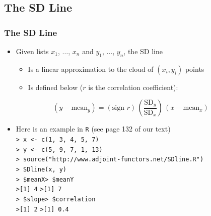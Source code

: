 \documentclass[t]{beamer}
\begin{document}
\subsection{The SD Line}
\begin{frame}[t]\frametitle{The SD Line}
{\small
\begin{itemize}
\item Given lists $x_1$, $\dots$, $x_n$ and $y_1$, $\dots$, $y_n$, the SD line 
   \begin{itemize}
   \item Is a linear approximation to the cloud of $(x_i, y_i)$ points
   \item Is defined below ($r$ is the  correlation coefficient):
\vspace{-4pt}
   \end{itemize}
\end{itemize}
\[\left(y - \mbox{mean}_y\right) = \left(\mbox{sign $r$}\right)\,
   \left(\frac{\mbox{SD}_y}{\mbox{SD}_x}\right)\,\left(x - \mbox{mean}_x\right)\]\vspace{-10pt}
\begin{itemize}
\item Here is an example in \texttt{R} (see page 132 of our text)\\
\texttt{> x <- c(1, 3, 4, 5, 7)}\\
\texttt{> y <- c(5, 9, 7, 1, 13)}\\
\texttt{> source("http://www.adjoint-functors.net/SDline.R")}\\
\texttt{> SDline(x, y)}\\
\texttt{> \$meanX}\hspace{30pt}\texttt{> \$meanY}\\
\texttt{>[1] 4}\hspace{37pt}   \texttt{>[1] 7}\\
\texttt{> \$slope}\hspace{30pt}\texttt{> \$correlation}\\
\texttt{>[1] 2}\hspace{37pt}   \texttt{>[1] 0.4}\\
\end{itemize}
}
\label{lastpage}
\end{frame}
\end{document}
